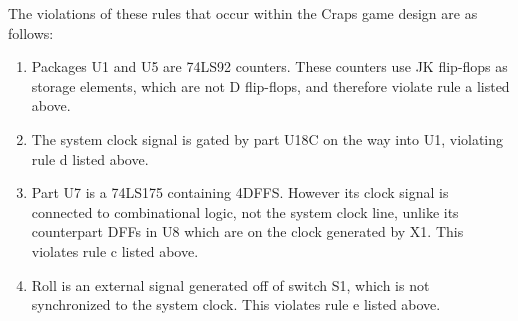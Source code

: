 \documentclass{article}
\begin{document}
\begin{enumerate}
    The violations of these rules that occur within the Craps game design are as 
    follows: 

    \begin{enumerate}
        \item Packages U1 and U5 are 74LS92 counters. These counters use 
              JK flip-flops as storage elements, which are not D flip-flops, and
              therefore violate rule a listed above. 
        \item The system clock signal is gated by part U18C on the way into U1,
              violating rule d listed above.
        \item Part U7 is a 74LS175 containing 4DFFS. However its clock signal 
              is connected to combinational logic, not the system clock line,
              unlike its counterpart DFFs in U8 which are on the clock generated
              by X1. This violates rule c listed above.
        \item Roll is an external signal generated off of switch S1, which is 
              not synchronized to the system clock. This violates rule e listed 
              above.
    \end{enumerate}


    \end{enumerate}

    \pagebreak
    \begin{scriptsize}
    
    \pagebreak
    
    \end{scriptsize}
\end{document}
